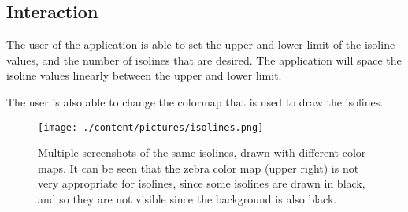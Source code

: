 \subsection{Interaction}
The user of the application is able to set the upper and lower limit of the isoline values, and the number of isolines that are desired.
The application will space the isoline values linearly between the upper and lower limit.

The user is also able to change the colormap that is used to draw the isolines.

\begin{figure}[htb]
  \centering
  \texttt{[image: ./content/pictures/isolines.png]}
  \caption{Multiple screenshots of the same isolines, drawn with different color maps. It can be seen that the zebra color map (upper right) is not very appropriate for isolines, since some isolines are drawn in black, and so they are not visible since the background is also black.}
\end{figure}
\clearpage